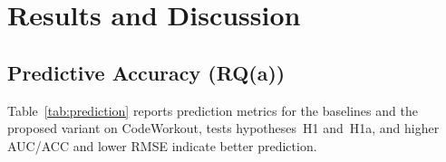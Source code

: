 \section{Results and Discussion}
\label{sec:results}

\subsection{Predictive Accuracy (RQ(a))}
Table~\ref{tab:prediction} reports prediction metrics for the baselines
and the proposed variant on CodeWorkout, tests hypotheses~H1 and~H1a, and
higher AUC/ACC and lower RMSE indicate better prediction.

\begin{table}[t]
\caption{\textbf{[ILLUSTRATIVE PLACEHOLDER NUMBERS]} Prediction accuracy
on CodeWorkout (mean $\pm$ std over 5 folds). Best in bold. Replace with
measured results before submission.}
\label{tab:prediction}
\centering
\small
{}
\end{table}


